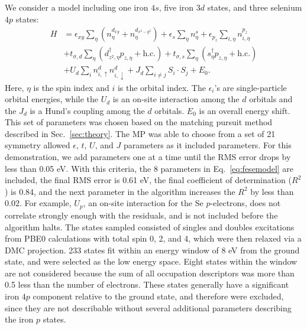 We consider a model including one iron $4s$, five iron $3d$ states, and three selenium $4p$ states:
\begin{align}
  H 
  &=
  \epsilon_{xy} \sum_{\eta} (n^{d_{xy}}_{\eta}  + n^{d_{x^2-y^2}}_{\eta})
  +
  \epsilon_s \sum_{\eta} n^{s}_{\eta} 
  +
  \epsilon_{p_{z}} \sum_{i,\eta} n^{p_{z}}_{i,\eta} 
  \nonumber \\
  &+ 
  t_{\sigma,d} \sum_{\eta} \left( d_{z^2,\eta}^{\dagger} p_{z,\eta} + \text{h.c.} \right)
  +
  t_{\sigma,s} \sum_{\eta} \left(s_{\eta}^{\dagger}  p_{z,\eta} + \text{h.c.} \right)
  \nonumber \\
  &+
  U_d \sum_{i} n^{d}_{i,\uparrow} n^{d}_{i,\downarrow} 
  +
  J_d \sum_{i\ne j} S_i \cdot S_j
  +
  E_0. \label{eq:fesemodel}
\end{align}
Here, $\eta$ is the spin index and $i$ is the orbital index.
The $\epsilon_i$'s are single-particle orbital energies, while the $U_d$ is an on-site interaction among the $d$ orbitals and the $J_d$ is a Hund's coupling among the $d$ orbitals.
$E_0$ is an overall energy shift.
This set of parameters was chosen based on the matching pursuit method described in Sec.~\ref{sec:theory}.
The MP was able to choose from a set of 21 symmetry allowed $\epsilon$, $t$, $U$, and $J$ parameters as it included parameters.  
For this demonstration, we add parameters one at a time until the RMS error drops by less than 0.05 eV. 
With this criteria, the 8 parameters in Eq.~\ref{eq:fesemodel} are included, the final RMS error is 0.61 eV, the final coefficient of determination ($R^2$) is 0.84, and the next parameter in the algorithm increases the $R^2$ by less than 0.02. 
For example, $U_p$, an on-site interaction for the Se $p$-electrons, does not correlate strongly enough with the residuals, and is not included before the algorithm halts.
The states sampled consisted of singles and doubles excitations from PBE0 calculations with total spin 0, 2, and 4, which were then relaxed via a DMC projection.
233 states fit within an energy window of 8 eV from the ground state, and were selected as the low energy space.
Eight states within the window are not considered because the sum of all occupation descriptors was more than 0.5 less than the number of electrons.
These states generally have a significant iron $4p$ component relative to the ground state, and therefore were excluded, since they are not describable without several additional parameters describing the iron $p$ states. 

